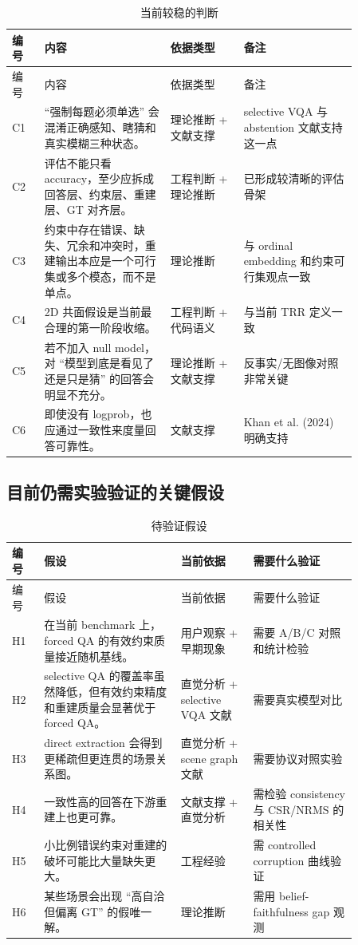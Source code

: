 \documentclass[11pt,a4paper]{ctexart}
\begin{document}
\begin{longtable}{p{0.08\linewidth}p{0.31\linewidth}p{0.18\linewidth}p{0.29\linewidth}}
\caption{当前较稳的判断}\label{tab:stable-claims}\\
\toprule
编号 & 内容 & 依据类型 & 备注 \\
\midrule
\endfirsthead
\toprule
编号 & 内容 & 依据类型 & 备注 \\
\midrule
\endhead
C1 & ``强制每题必须单选'' 会混淆正确感知、瞎猜和真实模糊三种状态。 & 理论推断 + 文献支撑 & selective VQA 与 abstention 文献支持这一点 \\
C2 & 评估不能只看 accuracy，至少应拆成回答层、约束层、重建层、GT 对齐层。 & 工程判断 + 理论推断 & 已形成较清晰的评估骨架 \\
C3 & 约束中存在错误、缺失、冗余和冲突时，重建输出本应是一个可行集或多个模态，而不是单点。 & 理论推断 & 与 ordinal embedding 和约束可行集观点一致 \\
C4 & 2D 共面假设是当前最合理的第一阶段收缩。 & 工程判断 + 代码语义 & 与当前 TRR 定义一致 \\
C5 & 若不加入 null model，对 ``模型到底是看见了还是只是猜'' 的回答会明显不充分。 & 理论推断 + 文献支撑 & 反事实/无图像对照非常关键 \\
C6 & 即使没有 logprob，也应通过一致性来度量回答可靠性。 & 文献支撑 & Khan et al. (2024) 明确支持 \\
\bottomrule
\end{longtable}

\subsection{目前仍需实验验证的关键假设}

\begin{longtable}{p{0.08\linewidth}p{0.34\linewidth}p{0.18\linewidth}p{0.26\linewidth}}
\caption{待验证假设}\label{tab:open-hypotheses}\\
\toprule
编号 & 假设 & 当前依据 & 需要什么验证 \\
\midrule
\endfirsthead
\toprule
编号 & 假设 & 当前依据 & 需要什么验证 \\
\midrule
\endhead
H1 & 在当前 benchmark 上，forced QA 的有效约束质量接近随机基线。 & 用户观察 + 早期现象 & 需要 A/B/C 对照和统计检验 \\
H2 & selective QA 的覆盖率虽然降低，但有效约束精度和重建质量会显著优于 forced QA。 & 直觉分析 + selective VQA 文献 & 需要真实模型对比 \\
H3 & direct extraction 会得到更稀疏但更连贯的场景关系图。 & 直觉分析 + scene graph 文献 & 需要协议对照实验 \\
H4 & 一致性高的回答在下游重建上也更可靠。 & 文献支撑 + 直觉分析 & 需检验 consistency 与 CSR/NRMS 的相关性 \\
H5 & 小比例错误约束对重建的破坏可能比大量缺失更大。 & 工程经验 & 需 controlled corruption 曲线验证 \\
H6 & 某些场景会出现 ``高自洽但偏离 GT'' 的假唯一解。 & 理论推断 & 需用 belief-faithfulness gap 观测 \\
\bottomrule
\end{longtable}
\end{document}
